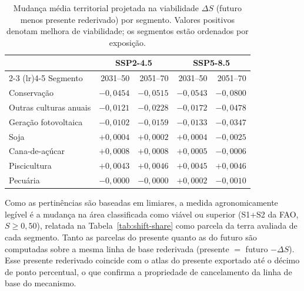 \begin{table}[H]
\centering
\caption{Mudança média territorial projetada na viabilidade $\Delta S$ (futuro menos
presente rederivado) por segmento. Valores positivos denotam melhora de viabilidade; os
segmentos estão ordenados por exposição.}
\label{tab:shift-mean}
\small
\begin{tabular}{@{}lrrrr@{}}
\toprule
 & \multicolumn{2}{c}{SSP2-4.5} & \multicolumn{2}{c}{SSP5-8.5} \\
\cmidrule(lr){2-3} \cmidrule(lr){4-5}
Segmento & 2031--50 & 2051--70 & 2031--50 & 2051--70 \\
\midrule
Conservação           & $-0{,}0454$ & $-0{,}0515$ & $-0{,}0543$ & $-0{,}0800$ \\
Outras culturas anuais & $-0{,}0121$ & $-0{,}0228$ & $-0{,}0172$ & $-0{,}0478$ \\
Geração fotovoltaica   & $-0{,}0102$ & $-0{,}0159$ & $-0{,}0133$ & $-0{,}0347$ \\
Soja                   & $+0{,}0004$ & $+0{,}0002$ & $+0{,}0004$ & $-0{,}0025$ \\
Cana-de-açúcar         & $+0{,}0008$ & $+0{,}0008$ & $+0{,}0005$ & $-0{,}0006$ \\
Piscicultura           & $+0{,}0043$ & $+0{,}0046$ & $+0{,}0045$ & $+0{,}0046$ \\
Pecuária               & $-0{,}0000$ & $-0{,}0000$ & $+0{,}0002$ & $-0{,}0010$ \\
\bottomrule
\end{tabular}
\end{table}

Como as pertinências são baseadas em limiares, a medida agronomicamente legível é a mudança
na área classificada como viável ou superior (S1+S2 da FAO, $S \ge 0{,}50$), relatada na
Tabela~\ref{tab:shift-share} como parcela da terra avaliada de cada segmento. Tanto as
parcelas do presente quanto as do futuro são computadas sobre a mesma linha de base rederivada
(presente $=$ futuro $- \Delta S$). Esse presente rederivado coincide com o atlas do presente
exportado até o décimo de ponto percentual, o que confirma a propriedade de cancelamento da
linha de base do mecanismo.

